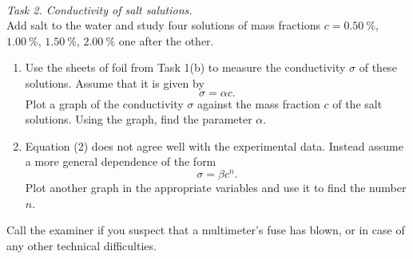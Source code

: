 \documentclass[../TST.tex]{subfiles}
\begin{document}
\begin{eproblem}{\ \\[5pt]}
\textit{Task 2. Conductivity of salt salutions.}\\
Add salt to the water and study four solutions of mass fractions $c=\qty{0.50}{\percent}$, $\qty{1.00}{\percent}$, $\qty{1.50}{\percent}$, $\qty{2.00}{\percent}$ one after the other. 

\begin{enumerate}
	\item Use the sheets of foil from Task 1(b) to measure the conductivity $\sigma$ of these solutions. Assume that it is given by
	\begin{equation}
	\sigma = \alpha c
	.
	\end{equation}
	Plot a graph of the conductivity $\sigma$ against the mass fraction $c$ of the salt solutions. Using the graph, find the parameter $\alpha$. 
	\item Equation (2) does not agree well with the experimental data. Instead assume a more general dependence of the form
\begin{equation}
\sigma = \beta c^n
.
\end{equation}
Plot another graph in the appropriate variables and use it to find the number $n$.   
\end{enumerate}

Call the examiner if you suspect that a multimeter's fuse has blown, or in case of any other technical difficulties.
\end{eproblem}
\end{document}
